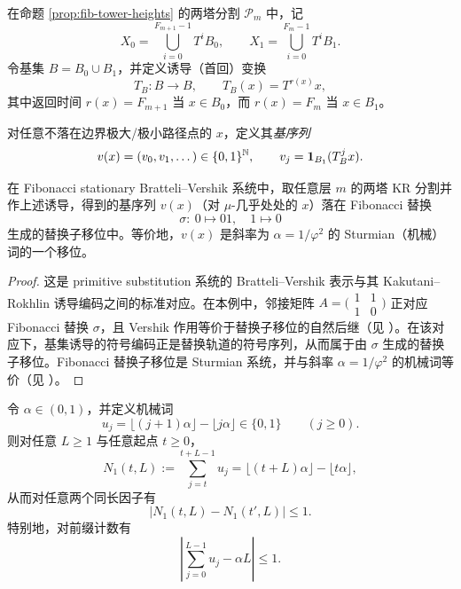 \begin{definition}[两塔诱导与基序列]
在命题 \ref{prop:fib-tower-heights} 的两塔分割 $\mathcal{P}_m$ 中，记
$$
X_0=\bigcup_{i=0}^{F_{m+1}-1}T^iB_0,\qquad
X_1=\bigcup_{i=0}^{F_{m}-1}T^iB_1.
$$
令基集 $B=B_0\cup B_1$，并定义诱导（首回）变换
$$
T_B:B\to B,\qquad T_B(x)=T^{r(x)}x,
$$
其中返回时间 $r(x)=F_{m+1}$ 当 $x\in B_0$，而 $r(x)=F_m$ 当 $x\in B_1$。

对任意不落在边界极大/极小路径点的 $x$，定义其\emph{基序列}
$$
v(x)=(v_0,v_1,\dots)\in\{0,1\}^{\mathbb{N}},\qquad v_j=\mathbf{1}_{B_1}(T_B^j x).
$$
\end{definition}

\begin{lemma}\label{lem:induced-fib-word}
在 Fibonacci stationary Bratteli--Vershik 系统中，取任意层 $m$ 的两塔 KR 分割并作上述诱导，得到的基序列 $v(x)$（对 $\mu$-几乎处处的 $x$）落在 Fibonacci 替换
$$
\sigma:\ 0\mapsto 01,\quad 1\mapsto 0
$$
生成的替换子移位中。等价地，$v(x)$ 是斜率为 $\alpha=1/\varphi^2$ 的 Sturmian（机械）词的一个移位。
\end{lemma}

\begin{proof}
这是 primitive substitution 系统的 Bratteli--Vershik 表示与其 Kakutani--Rokhlin 诱导编码之间的标准对应。在本例中，邻接矩阵
$
A=\bigl(\begin{smallmatrix}1&1\\1&0\end{smallmatrix}\bigr)
$
正对应 Fibonacci 替换 $\sigma$，且 Vershik 作用等价于替换子移位的自然后继（见 \cite{durand1999substitutional,queffelec2010substitution}）。在该对应下，基集诱导的符号编码正是替换轨道的符号序列，从而属于由 $\sigma$ 生成的替换子移位。Fibonacci 替换子移位是 Sturmian 系统，并与斜率 $\alpha=1/\varphi^2$ 的机械词等价（见 \cite{lothaire2002acow,pytheasfogg2002substitutions}）。
\end{proof}

\begin{lemma}\label{lem:fib-word-balance}
令 $\alpha\in(0,1)$，并定义机械词
$$
u_j=\lfloor (j+1)\alpha\rfloor-\lfloor j\alpha\rfloor\in\{0,1\}\qquad(j\ge 0).
$$
则对任意 $L\ge 1$ 与任意起点 $t\ge 0$，
$$
N_1(t,L):=\sum_{j=t}^{t+L-1} u_j=\lfloor (t+L)\alpha\rfloor-\lfloor t\alpha\rfloor,
$$
从而对任意两个同长因子有
$$
\big|N_1(t,L)-N_1(t',L)\big|\le 1.
$$
特别地，对前缀计数有
$$
\left|\sum_{j=0}^{L-1} u_j-\alpha L\right|\le 1.
$$
\end{lemma}

